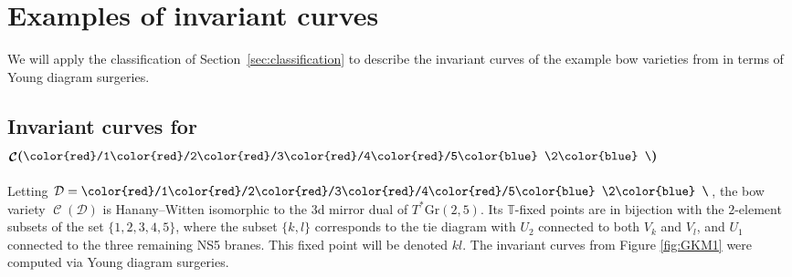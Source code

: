 \documentclass[pdftex]{sigma}
\numberwithin{equation}{section}
\newcommand{\brane}{\mathcal D}
\newcommand{\torus}{\mathbb T}
\def\ttt#1{\text{\tt #1}}
\newcommand\bs{{\color{blue} \char`\\}}
\newcommand\fs{{\color{red}/}}
\DeclareMathOperator{\bowvar}{\mathcal C}
\begin{document}
\section{Examples of invariant curves} \label{sec:examples}
We will apply the classification of Section~\ref{sec:classification} to describe the invariant curves of the example bow varieties from \cite{RS} in terms of Young diagram surgeries.

\subsection[Invariant curves ...]{Invariant curves for $\boldsymbol{\bowvar(\ttt{\fs 1\fs 2\fs 3\fs 4\fs 5\bs 2\bs})}$} \label{sec:dualofGr_2(C^5)}
Letting $\brane = \ttt{\fs 1\fs 2\fs 3\fs 4\fs 5\bs 2\bs}$, the bow variety $\bowvar(\brane)$ is Hanany--Witten isomorphic to the 3d mirror dual of $T^*\mathrm{Gr}(2,5)$. Its $\torus$-fixed points are in bijection with the $2$-element subsets of the set $\{1,2,3,4,5\}$, where the subset $\{k,l\}$ corresponds to the tie diagram with $U_2$ connected to both $V_k$ and $V_l$, and $U_1$ connected to the three remaining NS5 branes. This fixed point will be denoted $kl$. The invariant curves from Figure \ref{fig:GKM1} were computed via Young diagram surgeries.
\end{document}
